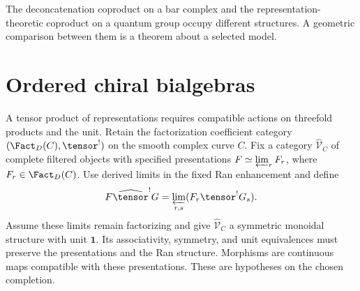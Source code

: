 The deconcatenation coproduct on a bar complex and the representation-theoretic coproduct on a quantum group occupy different structures. A geometric comparison between them is a theorem about a selected model.

\chapter{Ordered chiral bialgebras}
A tensor product of representations requires compatible actions on
threefold products and the unit.
Retain the factorization coefficient category
$(\Fact_D(C),\tensor^!)$ on the smooth complex curve $C$.
Fix a category $\widehat{\mathcal V}_C$ of complete filtered objects
with specified presentations $F\simeq\varprojlim_r F_r$,
where $F_r\in\Fact_D(C)$.
Use derived limits in the fixed Ran enhancement and define
\[
 F\widehat{\tensor}^{!}G
 =\varprojlim_{r,s}(F_r\tensor^!G_s).
\]
Assume these limits remain factorizing and give
$\widehat{\mathcal V}_C$ a symmetric monoidal structure with unit $\mathbf1$.
Its associativity, symmetry, and unit equivalences must preserve
the presentations and the Ran structure.
Morphisms are continuous maps compatible with these presentations.
These are hypotheses on the chosen completion.

